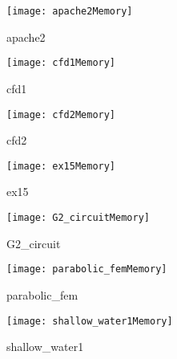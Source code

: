 \begin{figure}[H]
    \centering
    \begin{minipage}{0.45\textwidth}
        \centering
        \texttt{[image: apache2Memory]}
        \caption{apache2}
    \end{minipage}
    \begin{minipage}{0.45\textwidth}
        \centering
        \texttt{[image: cfd1Memory]}
        \caption{cfd1}
    \end{minipage}
\end{figure}

\begin{figure}[H]
    \centering
    \begin{minipage}{0.45\textwidth}
        \centering
        \texttt{[image: cfd2Memory]}
        \caption{cfd2}
    \end{minipage}
    \begin{minipage}{0.45\textwidth}
        \centering
        \texttt{[image: ex15Memory]}
        \caption{ex15}
    \end{minipage}
\end{figure}

\begin{figure}[H]
    \centering
    \begin{minipage}{0.45\textwidth}
        \centering
        \texttt{[image: G2\_circuitMemory]}
        \caption{G2\_circuit}
    \end{minipage}
    \begin{minipage}{0.45\textwidth}
        \centering
        \texttt{[image: parabolic\_femMemory]}
        \caption{parabolic\_fem}
    \end{minipage}
\end{figure}

\begin{figure}[H]
    \centering
    \begin{minipage}{0.45\textwidth}
        \centering
        \texttt{[image: shallow\_water1Memory]}
        \caption{shallow\_water1}
    \end{minipage}
\end{figure}